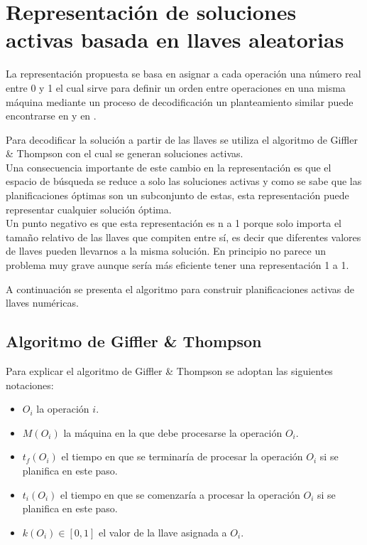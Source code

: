 \section{Representación de soluciones activas basada en llaves aleatorias}
La representación propuesta se basa en asignar a cada operación una número real entre 0 y 1 el cual sirve para definir un orden entre operaciones en una misma máquina mediante un proceso de decodificación un planteamiento similar puede encontrarse en \cite{norman1996random} y en \cite{Ponsich2013}.

Para decodificar la solución a partir de las llaves se utiliza el algoritmo de Giffler \& Thompson \cite{Giffler1960} con el cual se generan soluciones activas.\\ 

Una consecuencia importante de este cambio en la representación es que el espacio de búsqueda se reduce a solo las soluciones activas y como se sabe que las planificaciones óptimas son un subconjunto de estas, esta representación puede representar cualquier solución óptima. 
\\

Un punto negativo es que esta representación es n a 1 porque solo importa el tamaño relativo de las llaves que compiten entre sí, es decir que diferentes valores de llaves pueden llevarnos a la misma solución. En principio no parece un problema muy grave aunque sería más eficiente tener una representación 1 a 1.

A continuación se presenta el algoritmo para construir planificaciones activas de llaves numéricas.

\subsection{Algoritmo de Giffler \& Thompson}
Para explicar el algoritmo de Giffler \& Thompson se adoptan las siguientes notaciones:
\begin{itemize}
    \item $O_i$ la operación $i$.
    \item $M(O_i)$ la máquina en la que debe procesarse la operación $O_i$.
    \item $t_f(O_i)$ el tiempo en que se terminaría de procesar la operación $O_i$ si se planifica en este paso.
    \item $t_i(O_i)$ el tiempo en que se comenzaría a procesar la operación $O_i$ si se planifica en este paso.
    \item $k(O_i)\in [0,1]$ el valor de la llave asignada a $O_i$.
\end{itemize}

